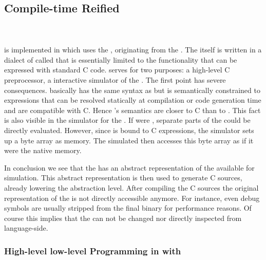 \subsection{Compile-time Reified \VMs}

\subsubsection*{\Squeak \ST \VM}
 \\

\WF is implemented in \PH which uses the , originating from the \Squeak \VM\cite{Inga97a}.
The \VM itself is written in a dialect of \ST called \Slang that is essentially limited to the functionality that can be expressed with standard C code.
\Slang serves for two purposes: a high-level C preprocessor, a interactive simulator of the \VM.
The first point has severe consequences.
\Slang basically has the same syntax as \ST but is semantically constrained to expressions that can be resolved statically at compilation or code generation time and are compatible with C.
Hence \Slang's semantics are closer to C than to \ST.
This fact is also visible in the simulator for the \VM.
If \Slang were \ST, separate parts of the \VM could be directly evaluated.
However, since \Slang is bound to C expressions, the simulator sets up a byte array as memory.
The simulated \VM then accesses this byte array as if it were the native memory.

In conclusion we see that the \PH \VM has an abstract representation of the \VM available for simulation.
This abstract representation is then used to generate C sources, already lowering the abstraction level.
After compiling the C sources the original representation of the \VM is not directly accessible anymore.
For instance, even debug symbols are usually stripped from the final binary for performance reasons.
Of course this implies that the \VM can not be changed nor directly inspected from language-side.


\subsubsection*{High-level low-level Programming in \Jikes with \MMTK}

